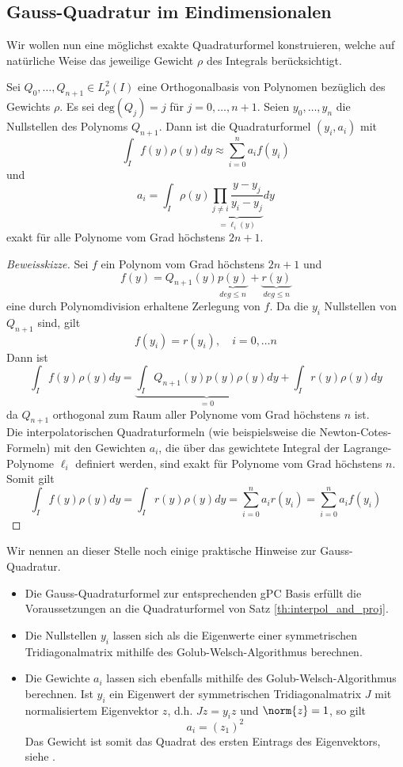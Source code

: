 \subsection{Gauss-Quadratur im Eindimensionalen}
Wir wollen nun eine möglichst exakte Quadraturformel konstruieren, welche auf natürliche Weise das jeweilige Gewicht $\rho$ des Integrals berücksichtigt.
\begin{maththeorem}
Sei $Q_0,\dots,Q_{n+1}\in L_\rho^2(I)$ eine Orthogonalbasis von Polynomen bezüglich des Gewichts $\rho$. Es sei $\text{deg}(Q_j)=j$ für $j=0,\dots,n+1$. Seien $y_0,\dots,y_n$ die Nullstellen des Polynoms $Q_{n+1}$. Dann ist die Quadraturformel $(y_i,a_i)$ mit 
\[\int_If(y)\rho(y)dy\approx \sum_{i=0}^na_if(y_i)\]
und 
\[a_i=\int_I \rho(y)\underbrace{\prod_{j\neq i} \frac{y-y_j}{y_i-y_j}}_{=\ell_i(y)}dy\]
exakt für alle Polynome vom Grad höchstens $2n+1$.
\end{maththeorem} 
\begin{proof}[Beweisskizze]
Sei $f$ ein Polynom vom Grad höchstens $2n+1$ und 
\[f(y)=Q_{n+1}(y)\underbrace{p(y)}_{deg \le n}+\underbrace{r(y)}_{deg \le n}\]
eine durch Polynomdivision erhaltene Zerlegung von $f$. Da die $y_i$ Nullstellen von $Q_{n+1}$ sind, gilt
\[f(y_i)=r(y_i),\quad i=0,\dots n\]
Dann ist
\[\int_If(y)\rho(y)dy=\underbrace{\int_IQ_{n+1}(y)p(y)\rho(y)dy}_{=0}+\int_Ir(y)\rho(y)dy\]
da $Q_{n+1}$ orthogonal zum Raum aller Polynome vom Grad höchstens $n$ ist.\\
Die interpolatorischen Quadraturformeln (wie beispielsweise die Newton-Cotes-Formeln) mit den Gewichten $a_i$, die über das gewichtete Integral der Lagrange-Polynome $\ell_i$ definiert werden, sind exakt für Polynome vom Grad höchstens $n$. Somit gilt
\[\int_If(y)\rho(y)dy=\int_Ir(y)\rho(y)dy=\sum_{i=0}^{n}a_ir(y_i)=\sum_{i=0}^{n}a_if(y_i)\]
\end{proof}
\begin{mathbem}
Wir nennen an dieser Stelle noch einige praktische Hinweise zur Gauss-Quadratur.
\begin{itemize}
\item Die Gauss-Quadraturformel zur entsprechenden gPC Basis erfüllt die Voraussetzungen an die Quadraturformel von Satz \ref{th:interpol_and_proj}.
\item Die Nullstellen $y_i$ lassen sich als die Eigenwerte einer symmetrischen Tridiagonalmatrix mithilfe des Golub-Welsch-Algorithmus berechnen.
\item Die Gewichte $a_i$ lassen sich ebenfalls mithilfe des Golub-Welsch-Algorithmus berechnen. Ist $y_i$ ein Eigenwert der symmetrischen Tridiagonalmatrix $J$ mit normalisiertem Eigenvektor $z$, d.h. $Jz=y_iz$ und $\norm{z}=1$, so gilt
\[a_i=(z_1)^2\]
Das Gewicht ist somit das Quadrat des ersten Eintrags des Eigenvektors, siehe \autocite{GolubWelsch}.
\end{itemize}
\end{mathbem}
